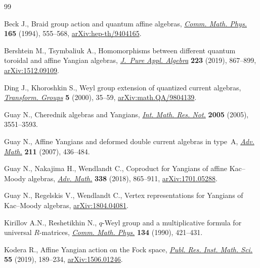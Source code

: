 \documentclass[10pt,a4paper]{amsart}
\theoremstyle{definition}
\numberwithin{equation}{section}
\begin{document}
\begin{thebibliography}{99}
\footnotesize\itemsep=0pt

Beck J., Braid group action and quantum affine algebras, \href{https://doi.org/10.1007/BF02099423}{\textit{Comm. Math.
 Phys.}} \textbf{165} (1994), 555--568, \href{https://arxiv.org/abs/hep-th/9404165}{arXiv:hep-th/9404165}.

Bershtein M., Tsymbaliuk A., Homomorphisms between different quantum toroidal
 and affine {Y}angian algebras, \href{https://doi.org/10.1016/j.jpaa.2018.05.003}{\textit{J.~Pure Appl. Algebra}} \textbf{223}
 (2019), 867--899, \href{https://arxiv.org/abs/1512.09109}{arXiv:1512.09109}.

Ding J., Khoroshkin S., Weyl group extension of quantized current algebras,
 \href{https://doi.org/10.1007/BF01237177}{\textit{Transform. Groups}} \textbf{5} (2000), 35--59,
 \href{https://arxiv.org/abs/math.QA/9804139}{arXiv:math.QA/9804139}.

Guay N., Cherednik algebras and {Y}angians, \href{https://doi.org/10.1155/IMRN.2005.3551}{\textit{Int. Math. Res. Not.}}
 \textbf{2005} (2005), 3551--3593.

Guay N., Affine {Y}angians and deformed double current algebras in type~{A},
 \href{https://doi.org/10.1016/j.aim.2006.08.007}{\textit{Adv. Math.}} \textbf{211} (2007), 436--484.

Guay N., Nakajima H., Wendlandt C., Coproduct for {Y}angians of affine
 {K}ac--{M}oody algebras, \href{https://doi.org/10.1016/j.aim.2018.09.013}{\textit{Adv. Math.}} \textbf{338} (2018), 865--911,
 \href{https://arxiv.org/abs/1701.05288}{arXiv:1701.05288}.

Guay N., Regelskis V., Wendlandt C., Vertex representations for {Y}angians of
 {K}ac--{M}oody algebras, \href{https://arxiv.org/abs/1804.04081}{arXiv:1804.04081}.

Kirillov A.N., Reshetikhin N., {$q$}-{W}eyl group and a multiplicative formula
 for universal {$R$}-matrices, \href{https://doi.org/10.1007/BF02097710}{\textit{Comm. Math. Phys.}} \textbf{134} (1990),
 421--431.

Kodera R., Affine {Y}angian action on the {F}ock space, \href{https://doi.org/10.4171/PRIMS/55-1-6}{\textit{Publ. Res.
 Inst. Math. Sci.}} \textbf{55} (2019), 189--234, \href{https://arxiv.org/abs/1506.01246}{arXiv:1506.01246}.


\end{thebibliography}
\end{document}
